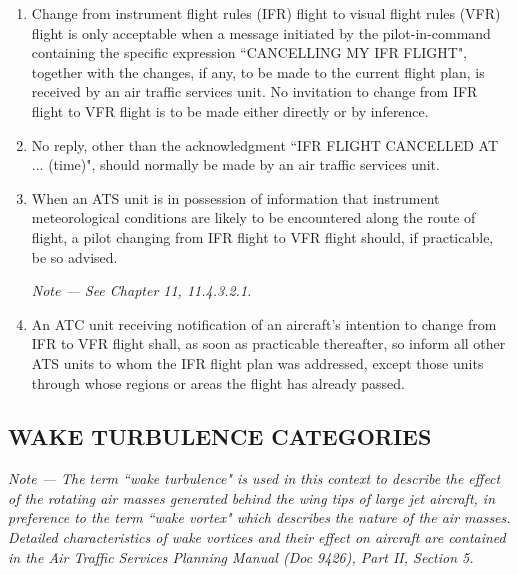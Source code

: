 \documentclass[../main.tex]{subfiles}
\begin{document}
    \begin{enumerate}[label=\arabic{section}.\arabic{subsection}.\arabic*]
        \item Change from instrument flight rules (IFR) flight to visual flight rules (VFR) flight is only acceptable when a message initiated by the pilot-in-command containing the specific expression ``CANCELLING MY IFR FLIGHT", together with the changes, if any, to be made to the current flight plan, is received by an air traffic services unit. No invitation to change from IFR flight to VFR flight is to be made either directly or by inference.
        \item No reply, other than the acknowledgment ``IFR FLIGHT CANCELLED AT ... (time)", should normally be made by an air traffic services unit.
        \item When an ATS unit is in possession of information that instrument meteorological conditions are likely to be encountered along the route of flight, a pilot changing from IFR flight to VFR flight should, if practicable, be so advised.

        \textit{Note --- See Chapter 11, 11.4.3.2.1.}

        \item An ATC unit receiving notification of an aircraft's intention to change from IFR to VFR flight shall, as soon as practicable thereafter, so inform all other ATS units to whom the IFR flight plan was addressed, except those units through whose regions or areas the flight has already passed.
    \end{enumerate}

    \subsection[Wake turbulence categories]{WAKE TURBULENCE CATEGORIES}

    \begin{enumempty}[labelindent=\parindent]
        \item \textit{Note --- The term ``wake turbulence" is used in this context to describe the effect of the rotating air masses generated behind the wing tips of large jet aircraft, in preference to the term ``wake vortex" which describes the nature of the air masses. Detailed characteristics of wake vortices and their effect on aircraft are contained in the Air Traffic Services Planning Manual (Doc 9426), Part II, Section 5.}
    \end{enumempty}
\end{document}
